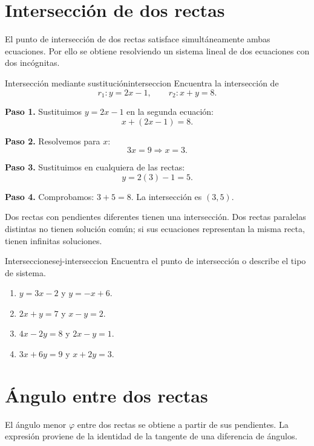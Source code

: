 \section{Intersección de dos rectas}

El punto de intersección de dos rectas satisface simultáneamente ambas
ecuaciones. Por ello se obtiene resolviendo un sistema lineal de dos
ecuaciones con dos incógnitas.

\begin{example}{Intersección mediante sustitución}{interseccion}
Encuentra la intersección de
\[
r_1:y=2x-1,
\qquad
r_2:x+y=8.
\]
\begin{solution}
\textbf{Paso 1.} Sustituimos $y=2x-1$ en la segunda ecuación:
\[
x+(2x-1)=8.
\]

\textbf{Paso 2.} Resolvemos para $x$:
\[
3x=9\Rightarrow x=3.
\]

\textbf{Paso 3.} Sustituimos en cualquiera de las rectas:
\[
y=2(3)-1=5.
\]

\textbf{Paso 4.} Comprobamos: $3+5=8$. La intersección es
$\boxed{(3,5)}$.
\end{solution}
\end{example}

\begin{remark}
Dos rectas con pendientes diferentes tienen una intersección. Dos rectas
paralelas distintas no tienen solución común; si sus ecuaciones representan
la misma recta, tienen infinitas soluciones.
\end{remark}

\begin{exercise}{Intersecciones}{ej-interseccion}
Encuentra el punto de intersección o describe el tipo de sistema.
\begin{enumerate}[label=\alph*)]
  \item $y=3x-2$ y $y=-x+6$.
  \item $2x+y=7$ y $x-y=2$.
  \item $4x-2y=8$ y $2x-y=1$.
  \item $3x+6y=9$ y $x+2y=3$.
\end{enumerate}
\end{exercise}

\section{Ángulo entre dos rectas}

El ángulo menor $\varphi$ entre dos rectas se obtiene a partir de sus
pendientes. La expresión proviene de la identidad de la tangente de una
diferencia de ángulos.

